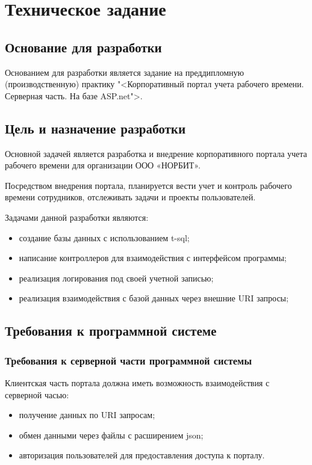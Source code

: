 \section{Техническое задание}
\subsection{Основание для разработки}

Основанием для разработки является задание на преддипломную (производственную) практику "<Корпоративный портал учета рабочего времени. Серверная часть. На базе ASP.net">.

\subsection{Цель и назначение разработки}

Основной задачей является разработка и внедрение корпоративного портала учета рабочего времени для организации ООО «НОРБИТ».

Посредством внедрения портала, планируется вести учет и контроль рабочего времени сотрудников, отслеживать задачи и проекты пользователей.

Задачами данной разработки являются:
\begin{itemize}
\item создание базы данных с использованием t-sql;
\item написание контроллеров для взаимодействия с интерфейсом программы;
\item реализация логирования под своей учетной записью;
\item реализация взаимодействия с базой данных через внешние URI запросы;
\end{itemize}

\subsection{Требования к программной системе}
\subsubsection{Требования к серверной части программной системы}

Клиентская часть портала должна иметь возможность взаимодействия с серверной часью:
\begin{itemize}
    \item получение данных по URI запросам;
    \item обмен данными через файлы с расширением json;
    \item авторизация пользователей для предоставления доступа к порталу.
\end{itemize}

